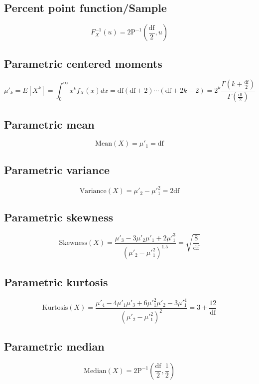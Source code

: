 \documentclass{article}
\begin{document}
\subsection{Percent point function/Sample}
\begin{equation*} F^{-1}_{X}\left(u\right)=2\text{P}^{-1}\left(\frac{\text{df}}{2},u\right) \end{equation*}
\subsection{Parametric centered moments}
\begin{equation*} \mu'_{k}=E[X^k]=\int_{0}^{\infty }x^{k}f_{X}\left(x\right)dx= \text{df}(\text{df}+2)\cdots(\text{df}+2k-2)=2^k\frac{\Gamma\left(k+\frac{\text{df}}{2}\right)}{\Gamma\left(\frac{\text{df}}{2}\right)} \end{equation*}
\subsection{Parametric mean}
\begin{equation*} \mathrm{Mean}(X)=\mu'_{1}=\text{df} \end{equation*}
\subsection{Parametric variance}
\begin{equation*} \mathrm{Variance}(X)=\mu'_{2}-\mu'^{2}_{1}=2 \text{df} \end{equation*}
\subsection{Parametric skewness}
\begin{equation*} \mathrm{Skewness}(X)=\frac{\mu'_{3}-3\mu'_{2}\mu'_{1}+2\mu'^{3}_{1}}{(\mu'_{2}-\mu'^{2}_{1})^{1.5}}=\sqrt{\frac{8}{\text{df}}} \end{equation*}
\subsection{Parametric kurtosis}
\begin{equation*} \mathrm{Kurtosis}(X)=\frac{\mu'_{4}-4\mu'_{1}\mu'_{3}+6\mu'^{2}_{1}\mu'_{2}-3\mu'^{4}_{1}}{(\mu'_{2}-\mu'^{2}_{1})^{2}}=3+\frac{12}{\text{df}} \end{equation*}
\subsection{Parametric median}
\begin{equation*} \mathrm{Median}(X)=2\text{P}^{-1}\left(\frac{\text{df}}{2},\frac{1}{2}\right) \end{equation*}
\end{document}
